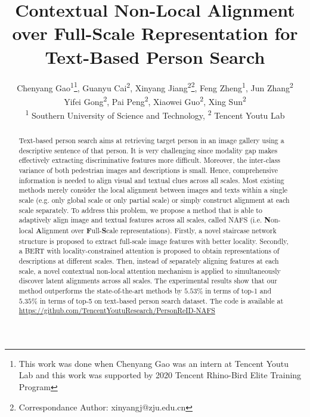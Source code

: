 \documentclass[final]{cvpr}
\begin{document}
\title{Contextual Non-Local Alignment over Full-Scale Representation for Text-Based Person Search}

\author
{Chenyang Gao\textsuperscript{\rm 1}\thanks{This work was done when Chenyang Gao was an intern at Tencent Youtu Lab and this work was supported by 2020 Tencent Rhino-Bird Elite Training Program}, 
Guanyu Cai\textsuperscript{\rm 2},
Xinyang Jiang\textsuperscript{\rm 2}\thanks{Correspondance Author: xinyangj@zju.edu.cn},
Feng Zheng\textsuperscript{\rm 1},
Jun Zhang\textsuperscript{\rm 2}\\
Yifei Gong\textsuperscript{\rm 2}, 
Pai Peng\textsuperscript{\rm 2},
Xiaowei Guo\textsuperscript{\rm 2},
Xing Sun\textsuperscript{\rm 2}\\
\textsuperscript{\rm 1} Southern University of Science and Technology, 
\textsuperscript{\rm 2} Tencent Youtu Lab\\
}


\maketitle

\begin{abstract}
Text-based person search aims at retrieving target person in an image gallery using a descriptive sentence of that person. 
It is very challenging since modality gap makes effectively extracting discriminative features more difficult. Moreover, the inter-class variance of both pedestrian images and descriptions is small. Hence, comprehensive information is needed to align visual and textual clues across all scales. 
Most existing methods merely consider the local alignment between images and texts within a single scale (e.g. only global scale or only partial scale) or simply construct alignment at each scale separately. 
To address this problem, we propose a method that is able to adaptively align image and textual features across all scales, called NAFS (i.e. \textbf{N}on-local \textbf{A}lignment over \textbf{F}ull-\textbf{S}cale representations). 
Firstly, a novel staircase network structure is proposed to extract full-scale image features with better locality. 
Secondly, a BERT with locality-constrained attention is proposed to obtain representations of descriptions at different scales. 
Then, instead of separately aligning features at each scale, a novel contextual non-local attention mechanism is applied to simultaneously discover latent alignments across all scales. The experimental results show that our method outperforms the state-of-the-art methods by $5.53\%$ in terms of top-1 and $5.35\%$ in terms of top-5 on text-based person search dataset. \textup{The code is available at \url{https://github.com/TencentYoutuResearch/PersonReID-NAFS}}

\end{abstract}
\end{document}
